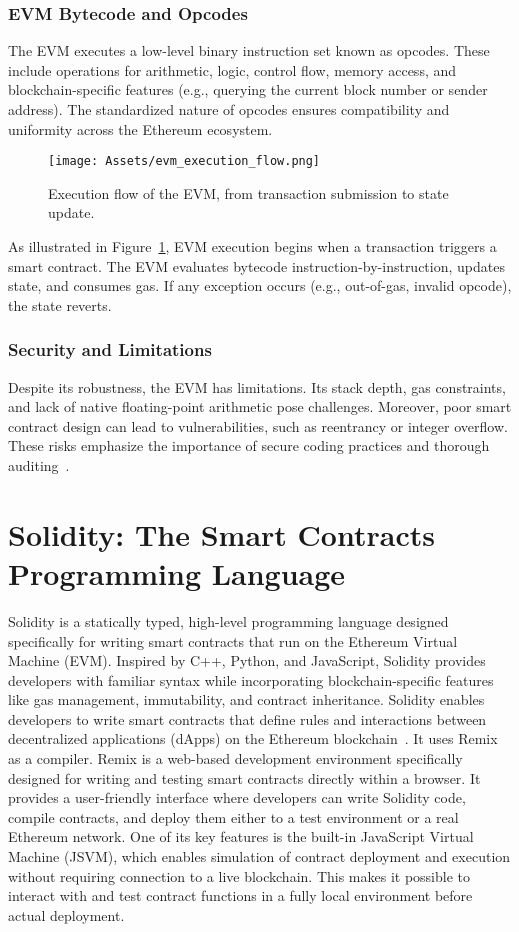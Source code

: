 \subsubsection{EVM Bytecode and Opcodes}
The EVM executes a low-level binary instruction set known as opcodes. These include operations for arithmetic, logic, control flow, memory access, and blockchain-specific features (e.g., querying the current block number or sender address). The standardized nature of opcodes ensures compatibility and uniformity across the Ethereum ecosystem.

\begin{figure}[H]
    \centering
    \texttt{[image: Assets/evm\_execution\_flow.png]}
    \caption{Execution flow of the EVM, from transaction submission to state update.}
    \label{fig:evm_execution_flow}
\end{figure}

As illustrated in Figure~\ref{fig:evm_execution_flow}, EVM execution begins when a transaction triggers a smart contract. The EVM evaluates bytecode instruction-by-instruction, updates state, and consumes gas. If any exception occurs (e.g., out-of-gas, invalid opcode), the state reverts.

\subsubsection{Security and Limitations}
Despite its robustness, the EVM has limitations. Its stack depth, gas constraints, and lack of native floating-point arithmetic pose challenges. Moreover, poor smart contract design can lead to vulnerabilities, such as reentrancy or integer overflow. These risks emphasize the importance of secure coding practices and thorough auditing~\cite{atzei2017survey}.

\section{Solidity: The Smart Contracts Programming Language}
Solidity is a statically typed, high-level programming language designed specifically for writing smart contracts that run on the Ethereum Virtual Machine (EVM). Inspired by C++, Python, and JavaScript, Solidity provides developers with familiar syntax while incorporating blockchain-specific features like gas management, immutability, and contract inheritance. Solidity enables developers to write smart contracts that define rules and interactions between decentralized applications (dApps) on the Ethereum blockchain~\cite{wood2014ethereum}. It uses Remix as a compiler. Remix is a web-based development environment specifically designed for writing and testing smart contracts directly within a browser. It provides a user-friendly interface where developers can write Solidity code, compile contracts, and deploy them either to a test environment or a real Ethereum network. One of its key features is the built-in JavaScript Virtual Machine (JSVM), which enables simulation of contract deployment and execution without requiring connection to a live blockchain. This makes it possible to interact with and test contract functions in a fully local environment before actual deployment.

